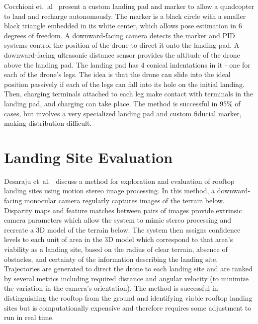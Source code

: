 Cocchioni et.~al~\cite{autonomous_landing_and_recharge} present a custom landing pad and marker to allow a quadcopter to land and recharge autonomously. The marker is a black circle with a smaller black triangle embedded in its white center, which allows pose estimation in 6 degrees of freedom. A downward-facing camera detects the marker and PID systems control the position of the drone to direct it onto the landing pad. A downward-facing ultrasonic distance sensor provides the altitude of the drone above the landing pad. The landing pad has 4 conical indentations in it - one for each of the drone's legs. The idea is that the drone can slide into the ideal position passively if each of the legs can fall into its hole on the initial landing. Then, charging terminals attached to each leg make contact with terminals in the landing pad, and charging can take place. The method is successful in 95\% of cases, but involves a very specialized landing pad and custom fiducial marker, making distribution difficult.

\section{Landing Site Evaluation}

Desaraju et~al.~\cite{rooftop_landing} discuss a method for exploration and evaluation of rooftop landing sites using motion stereo image processing. In this method, a downward-facing monocular camera regularly captures images of the terrain below. Disparity maps and feature matches between pairs of images provide extrinsic camera parameters which allow the system to mimic stereo processing and recreate a 3D model of the terrain below. The system then assigns confidence levels to each unit of area in the 3D model which correspond to that area's viability as a landing site, based on the radius of clear terrain, absence of obstacles, and certainty of the information describing the landing site. Trajectories are generated to direct the drone to each landing site and are ranked by several metrics including required distance and angular velocity (to minimize the variation in the camera's orientation). The method is successful in distinguishing the rooftop from the ground and identifying viable rooftop landing sites but is computationally expensive and therefore requires some adjustment to run in real time.

